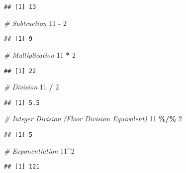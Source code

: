 \documentclass[
]{book}
\newenvironment{Shaded}{\begin{snugshade}}{\end{snugshade}}
\newcommand{\CommentTok}[1]{\textcolor[rgb]{0.56,0.35,0.01}{\textit{#1}}}
\newcommand{\DecValTok}[1]{\textcolor[rgb]{0.00,0.00,0.81}{#1}}
\newcommand{\SpecialCharTok}[1]{\textcolor[rgb]{0.81,0.36,0.00}{\textbf{#1}}}
\begin{document}
\begin{verbatim}
## [1] 13
\end{verbatim}

\begin{Shaded}
\begin{Highlighting}[]
\CommentTok{\# Subtraction}
\DecValTok{11} \SpecialCharTok{{-}} \DecValTok{2}  
\end{Highlighting}
\end{Shaded}

\begin{verbatim}
## [1] 9
\end{verbatim}

\begin{Shaded}
\begin{Highlighting}[]
\CommentTok{\# Multiplication}
\DecValTok{11} \SpecialCharTok{*} \DecValTok{2}
\end{Highlighting}
\end{Shaded}

\begin{verbatim}
## [1] 22
\end{verbatim}

\begin{Shaded}
\begin{Highlighting}[]
\CommentTok{\# Division}
\DecValTok{11} \SpecialCharTok{/} \DecValTok{2}
\end{Highlighting}
\end{Shaded}

\begin{verbatim}
## [1] 5.5
\end{verbatim}

\begin{Shaded}
\begin{Highlighting}[]
\CommentTok{\# Integer Division (Floor Division Equivalent)}
\DecValTok{11} \SpecialCharTok{\%/\%} \DecValTok{2}
\end{Highlighting}
\end{Shaded}

\begin{verbatim}
## [1] 5
\end{verbatim}

\begin{Shaded}
\begin{Highlighting}[]
\CommentTok{\# Exponentiation}
\DecValTok{11}\SpecialCharTok{\^{}}\DecValTok{2}
\end{Highlighting}
\end{Shaded}

\begin{verbatim}
## [1] 121
\end{verbatim}
\end{document}
